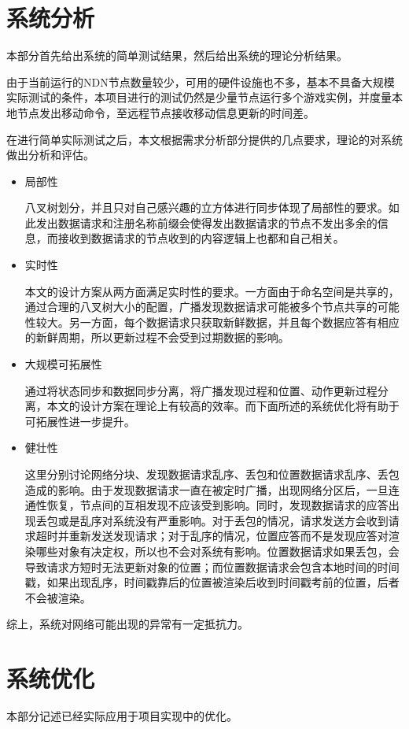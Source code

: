 \section{系统分析}
\par
本部分首先给出系统的简单测试结果，然后给出系统的理论分析结果。
\par
由于当前运行的NDN节点数量较少，可用的硬件设施也不多，基本不具备大规模实际测试的条件，本项目进行的测试仍然是少量节点运行多个游戏实例，并度量本地节点发出移动命令，至远程节点接收移动信息更新的时间差。
\par
在进行简单实际测试之后，本文根据需求分析部分提供的几点要求，理论的对系统做出分析和评估。
\begin{itemize}
\item
局部性

八叉树划分，并且只对自己感兴趣的立方体进行同步体现了局部性的要求。如此发出数据请求和注册名称前缀会使得发出数据请求的节点不发出多余的信息，而接收到数据请求的节点收到的内容逻辑上也都和自己相关。
\item
实时性

本文的设计方案从两方面满足实时性的要求。一方面由于命名空间是共享的，通过合理的八叉树大小的配置，广播发现数据请求可能被多个节点共享的可能性较大。另一方面，每个数据请求只获取新鲜数据，并且每个数据应答有相应的新鲜周期，所以更新过程不会受到过期数据的影响。
\item
大规模可拓展性

通过将状态同步和数据同步分离，将广播发现过程和位置、动作更新过程分离，本文的设计方案在理论上有较高的效率。而下面所述的系统优化将有助于可拓展性进一步提升。
\item
健壮性

这里分别讨论网络分块、发现数据请求乱序、丢包和位置数据请求乱序、丢包造成的影响。由于发现数据请求一直在被定时广播，出现网络分区后，一旦连通性恢复，节点间的互相发现不应该受到影响。同时，发现数据请求的应答出现丢包或是乱序对系统没有严重影响。对于丢包的情况，请求发送方会收到请求超时并重新发送发现请求；对于乱序的情况，位置应答而不是发现应答对渲染哪些对象有决定权，所以也不会对系统有影响。位置数据请求如果丢包，会导致请求方短时无法更新对象的位置；而位置数据请求会包含本地时间的时间戳，如果出现乱序，时间戳靠后的位置被渲染后收到时间戳考前的位置，后者不会被渲染。
\end{itemize}
\par
综上，系统对网络可能出现的异常有一定抵抗力。
\section{系统优化}
\label{OptimizationSection}
\par
本部分记述已经实际应用于项目实现中的优化。
